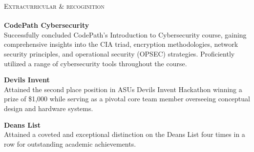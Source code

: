 \documentclass[a4paper]{article}
\newcommand{\lineunder} {
    \vspace*{-8pt} \\
    \hspace*{-18pt} \hrulefill \\
}
\newcommand{\header} [1] {
    {\hspace*{-18pt}\vspace*{6pt} \textsc{#1}}
    \vspace*{-6pt} \lineunder
}
\begin{document}
\header{Extracurricular \& recoginition}

\textbf{CodePath Cybersecurity}\\
Successfully concluded CodePath's Introduction to Cybersecurity course, gaining comprehensive insights into the CIA triad, encryption methodologies, network security principles, and operational security (OPSEC) strategies. Proficiently utilized a range of cybersecurity tools throughout the course.
\\
\vspace*{1mm}

\textbf{Devil\textquotesingle{}s Invent}\\
Attained the second place position in ASU\textquotesingle{}s Devil\textquotesingle{}s Invent Hackathon winning a prize of \$1,000 while serving as a pivotal core team member overseeing conceptual design and hardware systems.\\
\vspace*{1mm}

\textbf{Dean\textquotesingle{}s List}\\
Attained a coveted and exceptional distinction on the Dean\textquotesingle{}s List four times in a row for outstanding academic achievements.\\


\vspace*{1mm}
 
\end{document}
